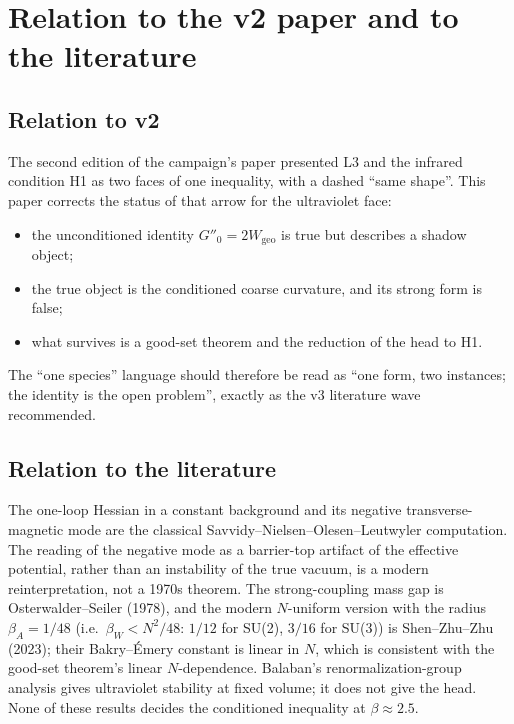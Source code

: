 \documentclass[11pt,a4paper]{article}
\begin{document}
\section{Relation to the v2 paper and to the literature}
\label{sec:relation}

\subsection{Relation to v2}

The second edition of the campaign's paper presented L3 and the infrared condition H1 as two faces
of one inequality, with a dashed ``same shape''. This paper corrects the status of that arrow for
the ultraviolet face:
\begin{itemize}
\item the unconditioned identity $G''_0=2W_{\mathrm{geo}}$ is true but describes a shadow object;
\item the true object is the conditioned coarse curvature, and its strong form is false;
\item what survives is a good-set theorem and the reduction of the head to H1.
\end{itemize}
The ``one species'' language should therefore be read as ``one form, two instances; the identity is
the open problem'', exactly as the v3 literature wave recommended.

\subsection{Relation to the literature}

The one-loop Hessian in a constant background and its negative transverse-magnetic mode are the
classical Savvidy--Nielsen--Olesen--Leutwyler computation. The reading of the negative mode as a
barrier-top artifact of the effective potential, rather than an instability of the true vacuum, is a
modern reinterpretation, not a 1970s theorem. The strong-coupling mass gap is Osterwalder--Seiler
(1978), and the modern $N$-uniform version with the radius $\beta_A=1/48$ (i.e.\ $\beta_W<N^2/48$:
$1/12$ for SU(2), $3/16$ for SU(3)) is Shen--Zhu--Zhu (2023); their
Bakry--\'Emery constant is linear in $N$, which is consistent with the good-set theorem's linear
$N$-dependence. Balaban's renormalization-group analysis gives ultraviolet stability at fixed
volume; it does not give the head. None of these results decides the conditioned inequality at
$\beta\approx2.5$.
\end{document}

